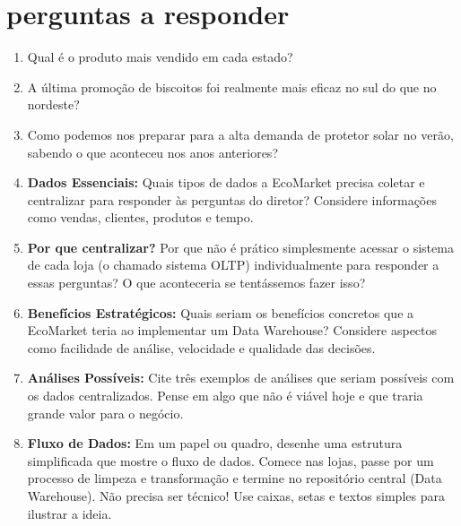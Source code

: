 \documentclass[a4paper,12pt]{article}
\begin{document}
\section{perguntas a responder}

\begin{enumerate}[leftmargin=*, label=\arabic*.]
    \item Qual é o produto mais vendido em cada estado?

    \item A última promoção de biscoitos foi realmente mais eficaz no sul do que no nordeste?

    \item Como podemos nos preparar para a alta demanda de protetor solar no verão, sabendo o que aconteceu nos anos anteriores?

    \item \textbf{Dados Essenciais:} Quais tipos de dados a EcoMarket precisa coletar e centralizar para responder às perguntas do diretor? Considere informações como vendas, clientes, produtos e tempo.
    
    \vspace{3cm} %

    \item \textbf{Por que centralizar?} Por que não é prático simplesmente acessar o sistema de cada loja (o chamado sistema OLTP) individualmente para responder a essas perguntas? O que aconteceria se tentássemos fazer isso?
    
    \vspace{3cm}

    \item \textbf{Benefícios Estratégicos:} Quais seriam os benefícios concretos que a EcoMarket teria ao implementar um Data Warehouse? Considere aspectos como facilidade de análise, velocidade e qualidade das decisões.
    
    \vspace{3cm}

    \item \textbf{Análises Possíveis:} Cite três exemplos de análises que seriam possíveis com os dados centralizados. Pense em algo que não é viável hoje e que traria grande valor para o negócio.
    
    \vspace{3cm}

    \item \textbf{Fluxo de Dados:} Em um papel ou quadro, desenhe uma estrutura simplificada que mostre o fluxo de dados. Comece nas lojas, passe por um processo de limpeza e transformação e termine no repositório central (Data Warehouse). Não precisa ser técnico! Use caixas, setas e textos simples para ilustrar a ideia.
    
    \vspace{4cm}
\end{enumerate}
\end{document}
